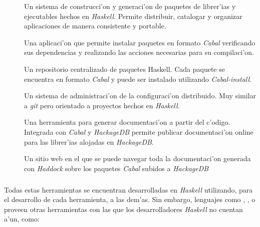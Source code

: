 \documentclass[a4paper]{article}
\begin{document}
\begin{description}
\item[] Un sistema de construcci'on y generaci'on de paquetes de librer'ias y ejecutables hechos en \textit{Haskell}.  Permite distribuir, catalogar y organizar aplicaciones de manera consistente y portable.
\item[] Una aplicaci'on que permite instalar paquetes en formato \textsl{Cabal} verificando sus dependencias y realizando las acciones necesarias para su compilaci'on.
\item[] Un repositorio centralizado de paquetes Haskell.  Cada paquete se encuentra en formato \textsl{Cabal} y puede ser instalado utilizando \textsl{Cabal-install}.
\item[] Un sistema de administraci'on de la configuraci'on distribuido.  Muy similar a \textsl{git} pero orientado a proyectos hechos en \textit{Haskell}.
\item[] Una herramienta para generar documentaci'on a partir del c'odigo.  Integrada con \textsl{Cabal} y \textsl{HackageDB} permite publicar documentaci'on online para las librer'ias alojadas en \textsl{HackageDB}.
\item[] Un sitio web en el que se puede navegar toda la documentaci'on generada con \textsl{Haddock} sobre los paquetes \textsl{Cabal} subidos a \textsl{HackageDB}
\end{description}
\subparagraph{}Todas estas herramientas se encuentran desarrolladas en \textit{Haskell} utilizando, para el desarrollo de cada herramienta, a las dem'as.  Sin embargo, lenguajes como , ,  o  proveen otras herramientas con las que los desarrolladores \textit{Haskell} no cuentan a'un, como:
\end{document}
